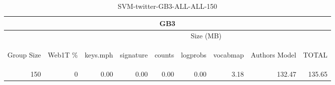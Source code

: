 \begin{center}
\begin{table}[htbp] 
 \begin{center}
\begin{tabular}{ | r | r | r | r | r | r | r | r | r |}
\hline
\multicolumn{9}{|c|}{GB3}\\
\hline
 & & \multicolumn{7}{|c|}{Size (MB)}\\ \cline{3-9}
\begin{sideways}Group Size\end{sideways} & \begin{sideways}Web1T \% \end{sideways} & \begin{sideways}keys.mph\end{sideways} & \begin{sideways}signature\end{sideways} & \begin{sideways}counts\end{sideways} & \begin{sideways}logprobs\end{sideways} & \begin{sideways}vocabmap\end{sideways} & \begin{sideways}Authors Model \end{sideways} & \begin{sideways}TOTAL\end{sideways}\\
\hline
\multirow{0}{*}{150}
 & 0 & 0.00 & 0.00 & 0.00 & 0.00 & 3.18 & 132.47 & 135.65\\ \cline{2-9}
\hline
\end{tabular}
\caption{SVM-twitter-GB3-ALL-ALL-150}
\label{table:SVM-twitter-GB3-ALL-ALL-150}
\end{center}
 \end{table}
\end{center}

